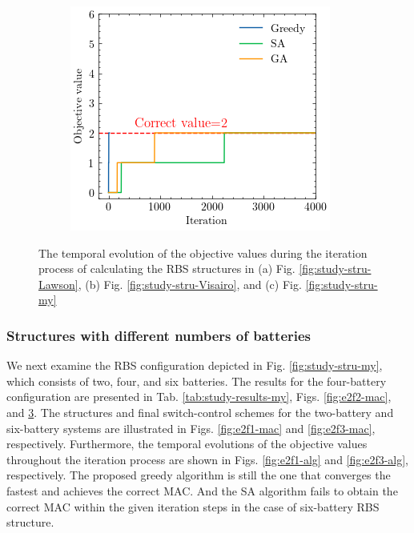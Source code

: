 \documentclass{article}
\begin{document}
\begin{figure}[htbp]
\begin{subfigure}[b]{0.32\textwidth}
        \caption{}
        \label{fig:f4-alg}
    \end{subfigure}
    \begin{subfigure}[b]{0.32\textwidth}
        \includegraphics[width=\textwidth]{e2f2-alg}
        \caption{}
        \label{fig:e2f2-alg}
    \end{subfigure}
    \caption{The temporal evolution of the objective values during the iteration process of calculating the RBS structures in (a) Fig. \ref{fig:study-stru-Lawson}, (b) Fig. \ref{fig:study-stru-Visairo}, and (c) Fig. \ref{fig:study-stru-my}}
\end{figure}

\subsubsection{Structures with different numbers of batteries}

We next examine the RBS configuration depicted in Fig. \ref{fig:study-stru-my}, which consists of two, four, and six batteries.
The results for the four-battery configuration are presented in Tab. \ref{tab:study-results-my}, Figs. \ref{fig:e2f2-mac}, and \ref{fig:e2f2-alg}.
The structures and final switch-control schemes for the two-battery and six-battery systems are illustrated in Figs. \ref{fig:e2f1-mac} and \ref{fig:e2f3-mac}, respectively.
Furthermore, the temporal evolutions of the objective values throughout the iteration process are shown in Figs. \ref{fig:e2f1-alg} and \ref{fig:e2f3-alg}, respectively.
The proposed greedy algorithm is still the one that converges the fastest and achieves the correct MAC. 
And the SA algorithm fails to obtain the correct MAC within the given iteration steps in the case of six-battery RBS structure. 
\end{document}
